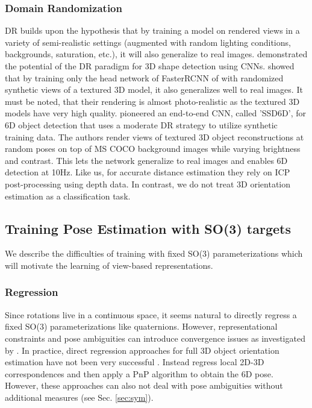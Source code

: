 \subsubsection{Domain Randomization} \gls{DR} builds upon the hypothesis that by training a model on rendered views in a variety of semi-realistic settings (augmented with random lighting conditions, backgrounds, saturation, etc.), it will also generalize to real images. \cite{tobin2017domain} demonstrated the potential of the \gls{DR} paradigm for 3D shape detection using \glspl{CNN}. \cite{hinterstoisser2017pre} showed that by training only the head network of FasterRCNN of \cite{ren2015faster} with randomized synthetic views of a textured 3D model, it also generalizes well to real images. It must be noted, that their rendering is almost photo-realistic as the textured 3D models have very high quality. \cite{kehl2017ssd} pioneered an end-to-end \gls{CNN}, called 'SSD6D', for 6D object detection that uses a moderate \gls{DR} strategy to utilize synthetic training data. The authors render views of textured 3D object reconstructions at random poses on top of MS COCO background images \citep{lin2014microsoft} while varying brightness and contrast. This lets the network generalize to real images and enables 6D detection at 10Hz. Like us, for accurate distance estimation they rely on \gls{ICP} post-processing using depth data. In contrast, we do not treat 3D orientation estimation as a classification task.

\subsection{Training Pose Estimation with SO(3) targets}

We describe the difficulties of training with fixed SO(3) parameterizations which will motivate the learning of view-based representations. 

\subsubsection{Regression} 

Since rotations live in a continuous space, it seems natural to directly regress a fixed SO(3) parameterizations like quaternions. However, representational constraints and pose ambiguities can introduce convergence issues as investigated by \cite{saxena2009learning}. In practice, direct regression approaches for full 3D object orientation estimation have not been very successful \citep{mahendran20173d}. Instead \cite{tremblay2018deep,tekin2017real,rad2017bb8} regress local 2D-3D correspondences and then apply a \gls{PnP} algorithm to obtain the 6D pose. However, these approaches can also not deal with pose ambiguities without additional measures (see Sec. \ref{sec:sym}).

